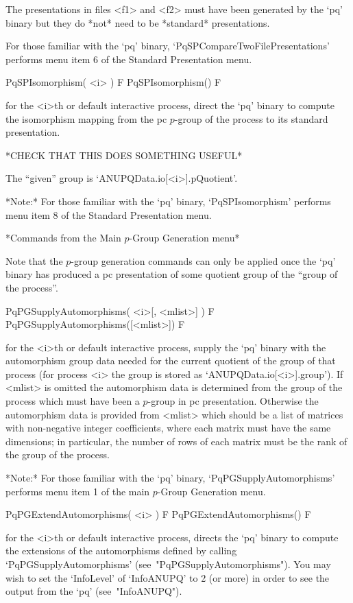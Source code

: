 The presentations in files <f1> and <f2> must have been generated by  the
`pq' binary but they do *not* need to be *standard* presentations.

For      those      familiar      with       the       `pq'       binary,
`PqSPCompareTwoFilePresentations' performs menu item 6  of  the  Standard
Presentation menu.

\>PqSPIsomorphism( <i> ) F
\>PqSPIsomorphism() F

for the <i>th or default interactive {\ANUPQ} process,  direct  the  `pq'
binary to compute the isomorphism mapping from the pc  $p$-group  of  the
process to its standard presentation.

*CHECK THAT THIS DOES SOMETHING USEFUL*

The ``given'' group is `ANUPQData.io[<i>].pQuotient'.

*Note:* For  those  familiar  with  the  `pq'  binary,  `PqSPIsomorphism'
performs menu item 8 of the Standard Presentation menu.

*Commands from the Main $p$-Group Generation menu*

Note that the $p$-group generation commands can only be applied once  the
`pq' binary has produced a pc presentation of some quotient group of  the
``group of the process''.

\>PqPGSupplyAutomorphisms( <i>[, <mlist>] ) F
\>PqPGSupplyAutomorphisms([<mlist>]) F

for the <i>th or default interactive {\ANUPQ} process,  supply  the  `pq'
binary with the automorphism group data needed for the  current  quotient
of the group of that process (for process <i>  the  group  is  stored  as
`ANUPQData.io[<i>].group'). If <mlist> is omitted the  automorphism  data
is determined from the group of  the  process  which  must  have  been  a
$p$-group in pc presentation. Otherwise the automorphism data is provided
from <mlist> which should be a list of matrices with non-negative integer
coefficients, where  each  matrix  must  have  the  same  dimensions;  in
particular, the number of rows of each matrix must be  the  rank  of  the
group of the process.

*Note:*
For  those  familiar  with  the  `pq'  binary,  `PqPGSupplyAutomorphisms'
performs menu item 1 of the main $p$-Group Generation menu.

\>PqPGExtendAutomorphisms( <i> ) F
\>PqPGExtendAutomorphisms() F

for the <i>th or default interactive {\ANUPQ} process, directs  the  `pq'
binary to compute the extensions of the automorphisms defined by  calling
`PqPGSupplyAutomorphisms' (see~"PqPGSupplyAutomorphisms"). You  may  wish
to set the `InfoLevel' of `InfoANUPQ' to 2 (or more) in order to see  the
output from the `pq' (see~"InfoANUPQ").

